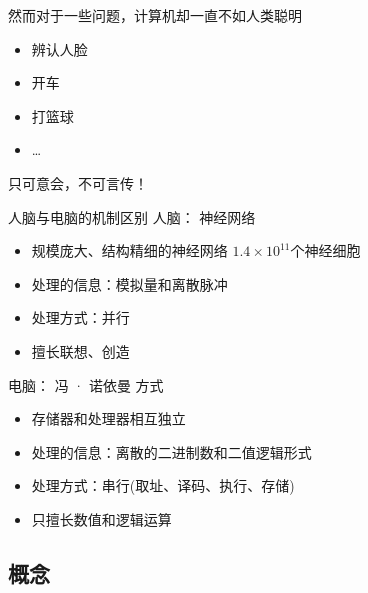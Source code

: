 \documentclass[xcolor=svgnames]{beamer}
\begin{document}
\begin{frame}
  然而对于一些问题，计算机却一直不如人类聪明
  \begin{itemize}
  \item 辨认人脸
  \item 开车
  \item 打篮球
  \item \ldots
  \end{itemize}
  \pause
  \begin{alertblock}{}
    只可意会，不可言传！
  \end{alertblock}
\end{frame}

\begin{frame}{人脑与电脑的机制区别}
    \pause
    人脑： 神经网络
    \pause
    \begin{itemize}[<+->]
    \item 规模庞大、结构精细的\alert{神经网络} $1.4\times 10^{11}$个神经细胞
    \item 处理的信息：\alert{模拟量}和离散脉冲
    \item 处理方式：\alert{并行}
    \item 擅长\alert{联想、创造}
    \end{itemize}
    \pause
    电脑： 冯 · 诺依曼 方式
    \pause
    \begin{itemize}[<+->]
    \item 存储器和处理器相互\alert{独立}
    \item 处理的信息：\alert{离散}的二进制数和二值逻辑形式
    \item 处理方式：\alert{串行}(取址、译码、执行、存储)
    \item 只擅长\alert{数值和逻辑运算}
    \end{itemize}
\end{frame}

\subsection{概念}
\label{sec:define}
\end{document}
